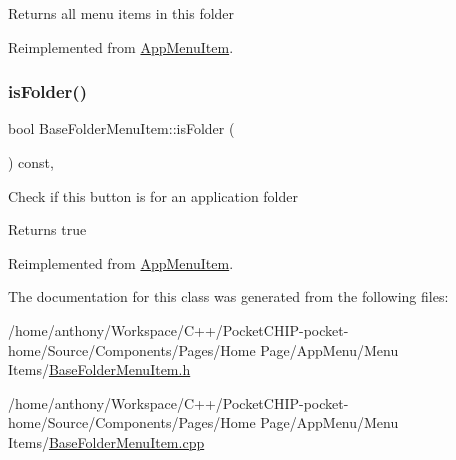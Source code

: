 \begin{DoxyReturn}{Returns}
all menu items in this folder 
\end{DoxyReturn}


Reimplemented from \mbox{\hyperlink{classAppMenuItem_a3a9b2ec87af0c063a892753bd64e944a}{App\+Menu\+Item}}.

\mbox{\label{classBaseFolderMenuItem_abde18847e5e1c7c06c23d8e947bfdcc6}} 
\subsubsection{\texorpdfstring{is\+Folder()}{isFolder()}}
{\footnotesize\ttfamily bool Base\+Folder\+Menu\+Item\+::is\+Folder (\begin{DoxyParamCaption}{ }\end{DoxyParamCaption}) const\hspace{0.3cm}{\ttfamily [override]}, {\ttfamily [virtual]}}

Check if this button is for an application folder \begin{DoxyReturn}{Returns}
true 
\end{DoxyReturn}


Reimplemented from \mbox{\hyperlink{classAppMenuItem_a8246d80e6cec284fa67a69eb8fa12354}{App\+Menu\+Item}}.



The documentation for this class was generated from the following files\+:\begin{DoxyCompactItemize}
\item 
/home/anthony/\+Workspace/\+C++/\+Pocket\+C\+H\+I\+P-\/pocket-\/home/\+Source/\+Components/\+Pages/\+Home Page/\+App\+Menu/\+Menu Items/\mbox{\hyperlink{BaseFolderMenuItem_8h}{Base\+Folder\+Menu\+Item.\+h}}\item 
/home/anthony/\+Workspace/\+C++/\+Pocket\+C\+H\+I\+P-\/pocket-\/home/\+Source/\+Components/\+Pages/\+Home Page/\+App\+Menu/\+Menu Items/\mbox{\hyperlink{BaseFolderMenuItem_8cpp}{Base\+Folder\+Menu\+Item.\+cpp}}\end{DoxyCompactItemize}
